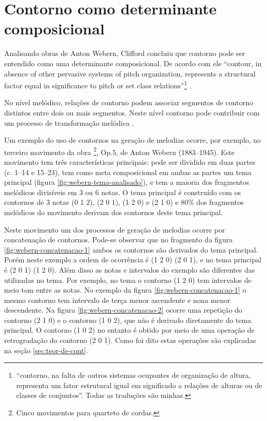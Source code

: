 \section{Contorno como determinante composicional}
\label{sec:cont-como-determ}

Analisando obras de Anton Webern, Clifford concluiu que contorno pode
ser entendido como uma determinante composicional. De acordo com ele
``contour, in absence of other pervasive systems of pitch
organization, represents a structural factor equal in significance to
pitch or set class relations''\footnote{``contorno, na falta de outros
  sistemas ocupantes de organização de altura, representa um fator
  estrutural igual em significado a relações de alturas ou de classes
  de conjuntos''. Todas as traduções são
  minhas.} \cite[p. 157]{clifford95:contour}.

No nível melódico, relações de contorno podem associar segmentos de
contorno distintos entre dois ou mais segmentos. Neste nível contorno
pode contribuir com um processo de transformação melódica
\cite[p. 159]{clifford95:contour}.

Um exemplo do uso de contornos na geração de melodias ocorre, por
exemplo, no terceiro movimento da obra \footnote{Cinco movimentos para quarteto de
  cordas.}, Op.5, de Anton Webern (1883--1945). Este movimento tem
três características principais: pode ser dividido em duas partes
(c. 1--14 e 15--23), tem como meta composicional em ambas as partes um
tema principal (figura \ref{fig:webern-tema-analisado}), e tem a
maioria dos fragmentos melódicos divisíveis em 3 ou 6 notas. O tema
principal é construído com os contornos de 3 notas (0 1 2), (2 0 1),
(1 2 0) e (2 1 0) e 80\% dos fragmentos melódicos do movimento derivam
dos contornos deste tema principal.

Neste movimento um dos processos de geração de melodias ocorre por
concatenação de contornos. Pode-se observar que no fragmento da figura
\ref{fig:webern-concatenacao-1} ambos os contornos são derivados do
tema principal. Porém neste exemplo a ordem de ocorrência é (1 2 0) (2
0 1), e no tema principal é (2 0 1) (1 2 0). Além disso as notas e
intervalos do exemplo são diferentes das utilizadas no tema. Por
exemplo, no tema o contorno (1 2 0) tem intervalos de meio tom entre
as notas. No exemplo da figura \ref{fig:webern-concatenacao-1} o mesmo
contorno tem intervalo de terça menor ascendente e nona menor
descendente. Na figura \ref{fig:webern-concatenacao-2} ocorre uma
repetição do contorno (2 1 0) e o contorno (1 0 2), que não é derivado
diretamente do tema principal. O contorno (1 0 2) no entanto é obtido
por meio de uma operação de retrogradação do contorno (2 0 1). Como
foi dito estas operações são explicadas na seção
\ref{sec:teor-de-cont}.

